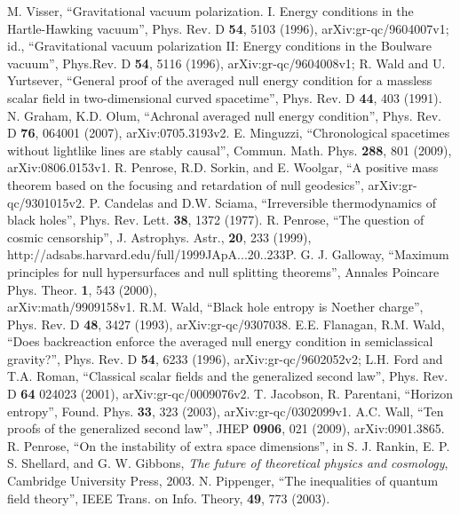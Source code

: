\documentclass{article}
\begin{document}
\begin{thebibliography}{99}
M. Visser, ``Gravitational vacuum polarization. I. Energy conditions in the Hartle-Hawking vacuum'', Phys. Rev. D \textbf{54}, 5103 (1996), arXiv:gr-qc/9604007v1; id., ``Gravitational vacuum polarization II: Energy conditions in the Boulware vacuum'', Phys.Rev. D \textbf{54}, 5116 (1996), arXiv:gr-qc/9604008v1;
R. Wald and U. Yurtsever, ``General proof of the averaged null energy condition for a massless scalar field in two-dimensional curved spacetime'', Phys. Rev. D \textbf{44}, 403 (1991).
N. Graham, K.D. Olum, ``Achronal averaged null energy condition'', Phys. Rev. D \textbf{76}, 064001 (2007), arXiv:0705.3193v2.
E. Minguzzi, ``Chronological spacetimes without lightlike lines are stably causal'', Commun. Math. Phys. \textbf{288}, 801 (2009), arXiv:0806.0153v1.
R. Penrose, R.D. Sorkin, and E. Woolgar, ``A positive mass theorem based on the focusing and retardation of null geodesics'', arXiv:gr-qc/9301015v2.
P. Candelas and D.W. Sciama, ``Irreversible thermodynamics of black holes'', Phys. Rev. Lett. \textbf{38}, 1372 (1977).
R. Penrose, ``The question of cosmic censorship'', J. Astrophys. Astr., \textbf{20}, 233 (1999), http://adsabs.harvard.edu/full/1999JApA...20..233P.
G. J. Galloway, ``Maximum principles for null hypersurfaces and null splitting theorems'', Annales Poincare Phys. Theor. \textbf{1}, 543 (2000), \\ arXiv:math/9909158v1.
R.M. Wald, ``Black hole entropy is Noether charge'', Phys. Rev. D \textbf{48}, 3427 (1993), arXiv:gr-qc/9307038.
E.E. Flanagan, R.M. Wald, ``Does backreaction enforce the averaged null energy condition in semiclassical gravity?'', Phys. Rev. D \textbf{54}, 6233 (1996), arXiv:gr-qc/9602052v2; L.H. Ford and T.A. Roman, ``Classical scalar fields and the generalized second law'', Phys. Rev. D \textbf{64} 024023 (2001), arXiv:gr-qc/0009076v2.
T. Jacobson, R. Parentani, ``Horizon entropy'', Found. Phys. \textbf{33}, 323 (2003), arXiv:gr-qc/0302099v1.
A.C. Wall, ``Ten proofs of the generalized second law'', JHEP \textbf{0906}, 021 (2009), arXiv:0901.3865.
R. Penrose, ``On the instability of extra space dimensions'', in S. J. Rankin, E. P. S. Shellard, and G. W. Gibbons, \textit{The future of theoretical physics and cosmology}, Cambridge University Press, 2003.
N. Pippenger, ``The inequalities of quantum field theory'', IEEE Trans. on Info. Theory, \textbf{49}, 773 (2003).

\end{thebibliography}
\end{document}
